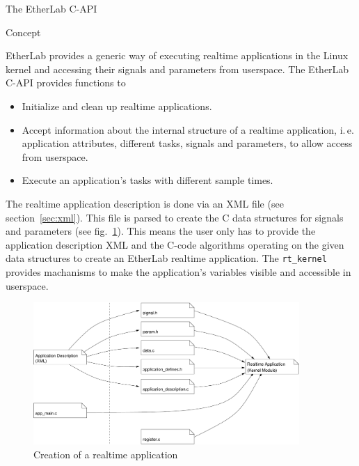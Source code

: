 \begin{ighsec}{The EtherLab C-API}
\label{sec:api}

\begin{ighsec}{Concept}
\label{sec:api-concept}

EtherLab provides a generic way of executing realtime applications in the
Linux kernel and accessing their signals and parameters from userspace. The
EtherLab C-API provides functions to

\begin{itemize}

\item Initialize and clean up realtime applications.

\item Accept information about the internal structure of a realtime
application, i.\,e.\,application attributes, different tasks, signals and
parameters, to allow access from userspace.

\item Execute an application's tasks with different sample times.

\end{itemize}

The realtime application description is done via an XML file (see
section~\ref{sec:xml}). This file is parsed to create the C data structures
for signals and parameters (see fig.~\ref{fig:c-api}). This means the user
only has to provide the application description XML and the C-code algorithms
operating on the given data structures to create an EtherLab realtime
application. The \texttt{rt\_kernel} provides machanisms to make the
application's variables visible and accessible in userspace.

\begin{figure}[H]
  \begin{center}
    \includegraphics[width=0.9\textwidth]{images/c-api}
    \caption{Creation of a realtime application}
    \label{fig:c-api}
  \end{center}
\end{figure}


\end{ighsec}
\end{ighsec}
